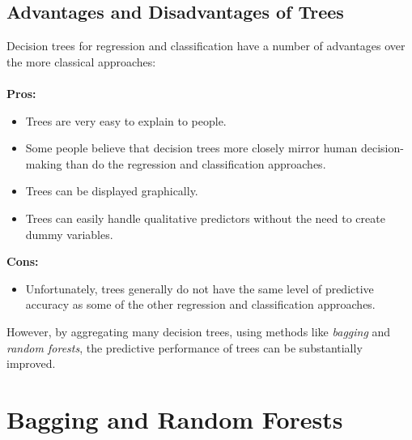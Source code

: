\subsection{Advantages and Disadvantages of Trees}
Decision trees for regression and classification have a number of advantages
over the more classical approaches:\\\\
\textbf{Pros:}
\begin{itemize}
    \item Trees are very easy to explain to people.
    
    \item Some people believe that decision trees more closely mirror human decision-making than do the regression and classification approaches.

    \item Trees can be displayed graphically.

    \item Trees can easily handle qualitative predictors without the need to create dummy variables. 
\end{itemize}
\textbf{Cons:}
\begin{itemize}
    \item Unfortunately, trees generally do not have the same level of predictive accuracy as some of the other regression and classification approaches.
\end{itemize}
However, by aggregating many decision trees, using methods like \textit{bagging} and \textit{random forests}, the predictive performance of trees can be
substantially improved.

\section{Bagging and Random Forests}
